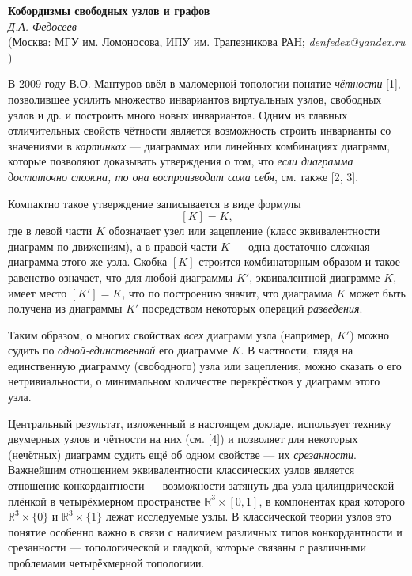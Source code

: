 \begin{center}{ \bf  Кобордизмы свободных узлов и графов}\\
{\it Д.А. Федосеев } \\
(Москва: МГУ им. Ломоносова, ИПУ им. Трапезникова РАН; {\it denfedex@yandex.ru} )
\end{center}


В 2009 году В.О. Мантуров ввёл в маломерной топологии понятие {\em чётности} [1], позволившее усилить множество
инвариантов виртуальных узлов, свободных узлов и др. и построить много новых инвариантов. Одним из главных отличительных свойств чётности является возможность строить инварианты со значениями в {\em картинках} --- диаграммах или линейных комбинациях диаграмм, которые позволяют доказывать утверждения о том, что {\em если диаграмма достаточно сложна, то она воспроизводит сама себя}, см. также [2, 3].

Компактно такое утверждение записывается в виде формулы $$[K]=K,$$ где в левой части $K$ обозначает узел или зацепление
(класс эквивалентности диаграмм по движениям), а в правой части $K$ --- одна достаточно сложная диаграмма этого же узла. Скобка $[K]$ строится комбинаторным образом и такое равенство означает, что для любой диаграммы $K'$, эквивалентной диаграмме $K$, имеет место $[K']=K$, что по построению значит, что диаграмма $K$ может быть получена из диаграммы $K'$ посредством некоторых операций {\em разведения}.

Таким образом, о многих свойствах {\em всех} диаграмм узла (например, $K'$) можно судить по {\em одной-единственной} его диаграмме $K$. В частности, глядя на единственную диаграмму (свободного) узла или зацепления, можно сказать о его нетривиальности, о минимальном количестве перекрёстков у диаграмм этого узла.

Центральный результат, изложенный в настоящем докладе, использует технику двумерных узлов и чётности на них (см. [4]) и позволяет для некоторых (нечётных) диаграмм судить ещё об одном свойстве --- их {\em срезанности}.
Важнейшим отношением эквивалентности классических узлов является отношение конкордантности --- возможности затянуть два узла цилиндрической плёнкой в четырёхмерном пространстве $\mathbb{R}^{3}\times [0,1]$, в компонентах края которого $\mathbb{R}^{3}\times \{0\}$ и $\mathbb{R}^{3}\times \{1\}$ лежат исследуемые узлы. В классической теории узлов это понятие особенно важно в связи с наличием различных типов конкордантности и срезанности --- топологической и гладкой, которые связаны с различными проблемами четырёхмерной топологиии.


